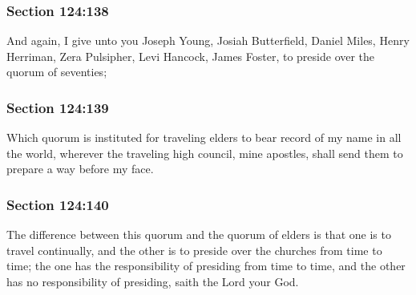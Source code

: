 	\subsubsection{Section 124:138} %
		\label{DC124-138}

		And again, I give unto you Joseph Young, Josiah Butterfield, Daniel Miles, Henry Herriman, Zera Pulsipher, Levi Hancock, James Foster, to preside over the quorum of seventies;


	\subsubsection{Section 124:139} %
		\label{DC124-139}

		Which quorum is instituted for traveling elders to bear record of my name in all the world, wherever the traveling high council, mine apostles, shall send them to prepare a way before my face.


	\subsubsection{Section 124:140} %
		\label{DC124-140}

		The difference between this quorum and the quorum of elders is that one is to travel continually, and the other is to preside over the churches from time to time; the one has the responsibility of presiding from time to time, and the other has no responsibility of presiding, saith the Lord your God.

